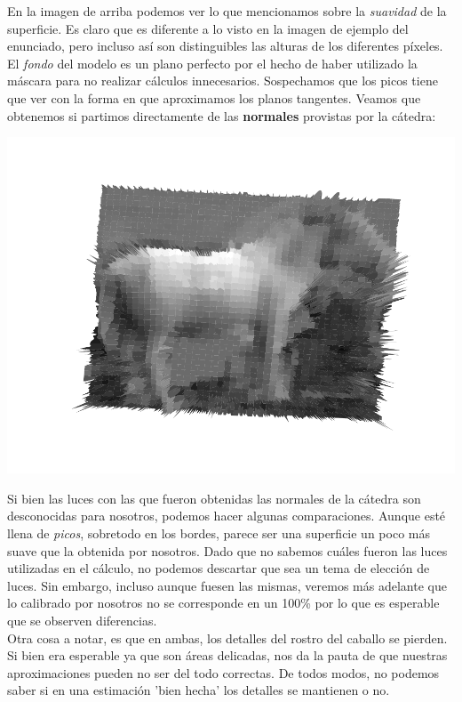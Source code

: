 En la imagen de arriba podemos ver lo que mencionamos sobre la \textit{suavidad} de la superficie. Es claro que es diferente a lo visto en la imagen de ejemplo del enunciado, pero incluso así son distinguibles las alturas de los diferentes píxeles. El \textit{fondo} del modelo es un plano perfecto por el hecho de haber utilizado la máscara para no realizar cálculos innecesarios. Sospechamos que los picos tiene que ver con la forma en que aproximamos los planos tangentes. Veamos que obtenemos si partimos directamente de las \textbf{normales} provistas por la cátedra:

{\centering
    \includegraphics[scale=0.65]{informe/imagenes/profundidadesCaballoNormalescatedra.pdf} \\
}

Si bien las luces con las que fueron obtenidas las normales de la cátedra son desconocidas para nosotros, podemos hacer algunas comparaciones. Aunque esté llena de \textit{picos}, sobretodo en los bordes, parece ser una superficie un poco más suave que la obtenida por nosotros. Dado que no sabemos cuáles fueron las luces utilizadas en el cálculo, no podemos descartar que sea un tema de elección de luces. Sin embargo, incluso aunque fuesen las mismas, veremos más adelante que lo calibrado por nosotros no se corresponde en un 100\% por lo que es esperable que se observen diferencias. \\

Otra cosa a notar, es que en ambas, los detalles del rostro del caballo se pierden. Si bien era esperable ya que son áreas delicadas, nos da la pauta de que nuestras aproximaciones pueden no ser del todo correctas. De todos modos, no podemos saber si en una estimación 'bien hecha' los detalles se mantienen o no. \\

